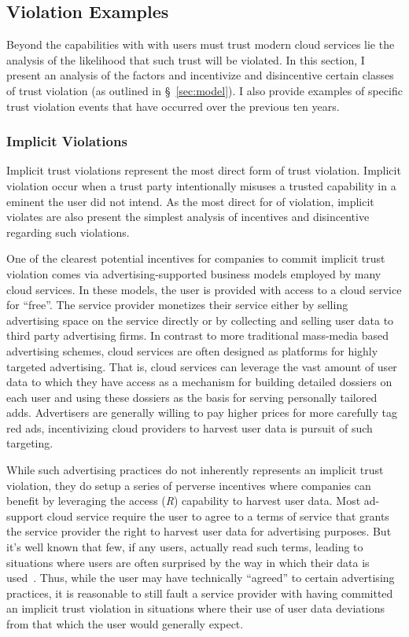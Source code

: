 \subsection{Violation Examples}
\label{sec:analysis:violations}

Beyond the capabilities with with users must trust modern cloud
services lie the analysis of the likelihood that such trust will be
violated. In this section, I present an analysis of the factors and
incentivize and disincentive certain classes of trust violation (as
outlined in \S~\ref{sec:model}). I also provide examples of specific
trust violation events that have occurred over the previous ten years.

\subsubsection{Implicit Violations}

Implicit trust violations represent the most direct form of trust
violation. Implicit violation occur when a trust party intentionally
misuses a trusted capability in a eminent the user did not intend. As
the most direct for of violation, implicit violates are also present
the simplest analysis of incentives and disincentive regarding such
violations.

One of the clearest potential incentives for companies to commit
implicit trust violation comes via advertising-supported business
models employed by many cloud services. In these models, the user is
provided with access to a cloud service for ``free''. The service
provider monetizes their service either by selling advertising space
on the service directly or by collecting and selling user data to
third party advertising firms. In contrast to more traditional
mass-media based advertising schemes, cloud services are often
designed as platforms for highly targeted advertising. That is, cloud
services can leverage the vast amount of user data to which they have
access as a mechanism for building detailed dossiers on each user and
using these dossiers as the basis for serving personally tailored
adds. Advertisers are generally willing to pay higher prices for more
carefully tag red ads, incentivizing cloud providers to harvest user
data is pursuit of such targeting.

While such advertising practices do not inherently represents an
implicit trust violation, they do setup a series of perverse
incentives where companies can benefit by leveraging the access
(\emph{R}) capability to harvest user data. Most ad-support cloud
service require the user to agree to a terms of service that grants
the service provider the right to harvest user data for advertising
purposes. But it's well known that few, if any users, actually read
such terms, leading to situations where users are often surprised by
the way in which their data is used~\cite{hern2015}. Thus, while the
user may have technically ``agreed'' to certain advertising practices,
it is reasonable to still fault a service provider with having
committed an implicit trust violation in situations where their use of
user data deviations from that which the user would generally expect.


